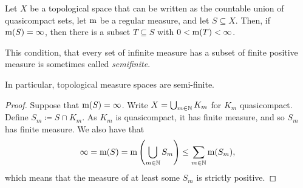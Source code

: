 \begin{prp}\label{Semifinite}
Let $X$ be a topological space that can be written as the countable union of quasicompact sets, let $\mathrm{m}$ be a regular measure, and let $S\subseteq X$.  Then, if $\mathrm{m} (S)=\infty$, then there is a subset $T\subseteq S$ with $0<\mathrm{m} (T)<\infty$.
\begin{rmk}
This condition, that every set of infinite measure has a subset of finite positive measure is sometimes called \emph{semifinite}.
\end{rmk}
\begin{rmk}
In particular, topological measure spaces are semi-finite.
\end{rmk}
\begin{proof}
Suppose that $\mathrm{m} (S)=\infty$.  Write $X=\bigcup _{m\in \mathbb{N}}K_m$ for $K_m$ quasicompact.  Define $S_m\coloneqq S\cap K_m$.  As $K_m$ is quasicompact, it has finite measure, and so $S_m$ has finite measure.  We also have that
\begin{equation}
\infty =\mathrm{m} (S)=\mathrm{m} \left( \bigcup _{m\in \mathbb{N}}S_m\right) \leq \sum _{m\in \mathbb{N}}\mathrm{m} (S_m),
\end{equation}
which means that the measure of at least some $S_m$ is strictly positive.
\end{proof}
\end{prp}
